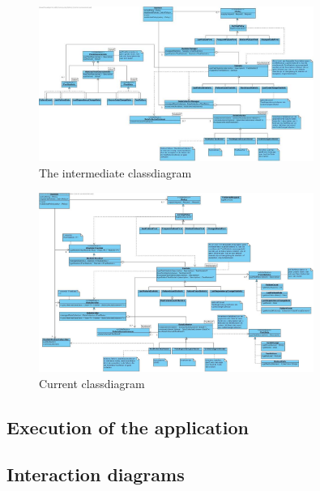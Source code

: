 \documentclass[i2]{oss}
\begin{document}
\begin{figure}[tbp]
\begin{center}
    \includegraphics[width=0.8\textwidth]{klassendiagram}
    \caption{The intermediate classdiagram}
	\label{fig:kd-tt}
\end{center}
\end{figure}




\begin{figure}[tbp]
\begin{center}
    \includegraphics[width=0.8\textwidth]{klassendiagram3}
    \caption{Current classdiagram}
	\label{fig:kd-h}
\end{center}
\end{figure}



\subsection{Execution of the application}


\subsection{Interaction diagrams}
\label{ssec:Interactiedia}
\end{document}
